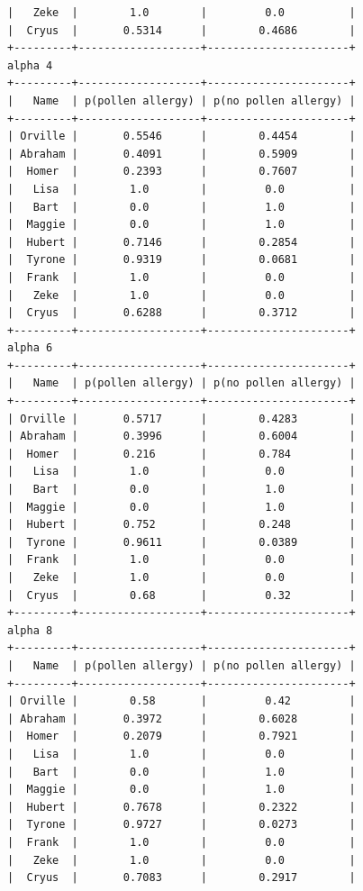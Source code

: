 \documentclass{article}
\begin{document}
\begin{lstlisting}
|   Zeke  |        1.0        |         0.0          |
|  Cryus  |       0.5314      |        0.4686        |
+---------+-------------------+----------------------+
alpha 4
+---------+-------------------+----------------------+
|   Name  | p(pollen allergy) | p(no pollen allergy) |
+---------+-------------------+----------------------+
| Orville |       0.5546      |        0.4454        |
| Abraham |       0.4091      |        0.5909        |
|  Homer  |       0.2393      |        0.7607        |
|   Lisa  |        1.0        |         0.0          |
|   Bart  |        0.0        |         1.0          |
|  Maggie |        0.0        |         1.0          |
|  Hubert |       0.7146      |        0.2854        |
|  Tyrone |       0.9319      |        0.0681        |
|  Frank  |        1.0        |         0.0          |
|   Zeke  |        1.0        |         0.0          |
|  Cryus  |       0.6288      |        0.3712        |
+---------+-------------------+----------------------+
alpha 6
+---------+-------------------+----------------------+
|   Name  | p(pollen allergy) | p(no pollen allergy) |
+---------+-------------------+----------------------+
| Orville |       0.5717      |        0.4283        |
| Abraham |       0.3996      |        0.6004        |
|  Homer  |       0.216       |        0.784         |
|   Lisa  |        1.0        |         0.0          |
|   Bart  |        0.0        |         1.0          |
|  Maggie |        0.0        |         1.0          |
|  Hubert |       0.752       |        0.248         |
|  Tyrone |       0.9611      |        0.0389        |
|  Frank  |        1.0        |         0.0          |
|   Zeke  |        1.0        |         0.0          |
|  Cryus  |        0.68       |         0.32         |
+---------+-------------------+----------------------+
alpha 8
+---------+-------------------+----------------------+
|   Name  | p(pollen allergy) | p(no pollen allergy) |
+---------+-------------------+----------------------+
| Orville |        0.58       |         0.42         |
| Abraham |       0.3972      |        0.6028        |
|  Homer  |       0.2079      |        0.7921        |
|   Lisa  |        1.0        |         0.0          |
|   Bart  |        0.0        |         1.0          |
|  Maggie |        0.0        |         1.0          |
|  Hubert |       0.7678      |        0.2322        |
|  Tyrone |       0.9727      |        0.0273        |
|  Frank  |        1.0        |         0.0          |
|   Zeke  |        1.0        |         0.0          |
|  Cryus  |       0.7083      |        0.2917        |

\end{lstlisting}
\end{document}
